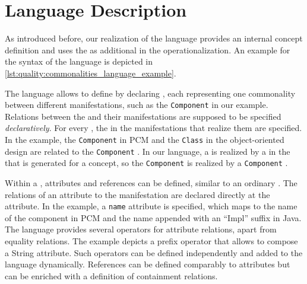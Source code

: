 \section{Language Description}

As introduced before, our realization of the \commonalities language
provides an internal concept definition and uses the \conceptmetamodels as additional \metamodels in the operationalization.
An example for the syntax of the \commonalities language is depicted in \autoref{lst:quality:commonalities_language_example}.




The language allows to define \conceptmetamodels by declaring \commonalities, each representing one commonality between different manifestations, such as the \texttt{Component} \commonality in our example.
Relations between the \conceptmetamodels and their manifestations are supposed to be specified \emph{declaratively}.
For every \commonality, the \metaclasses in the manifestations that realize them are specified.
In the example, the \texttt{Component} in \ac{PCM} and the \texttt{Class} in the object-oriented design \conceptmetamodel are %
related to the \texttt{Component} \commonality.
In our language, a \commonality is realized by a \metaclass in the \metamodel that is generated for a concept, so the \texttt{Component} \commonality is realized by a \texttt{Component} \metaclass.

Within a \commonality, attributes and references can be defined, similar to an ordinary \metaclass.
The relations of an attribute to the manifestation are declared directly at the attribute.
In the example, a \texttt{name} attribute is specified, which maps to the name of the component in \ac{PCM} and the name appended with an \enquote{Impl} suffix in Java.
The language %
provides several operators for attribute relations, apart from equality relations.
The example depicts a prefix operator that allows to compose a String attribute.
Such operators can be defined independently and added to the language dynamically.
References can be defined comparably to attributes but can be enriched with a definition of containment relations.

